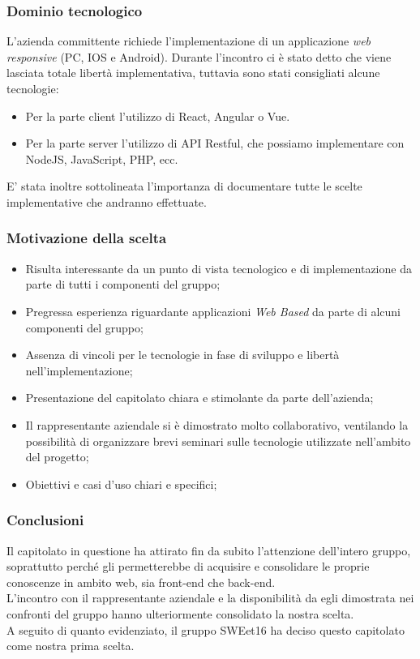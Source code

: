 \documentclass[a4paper, 11pt]{article}
\begin{document}
\subsubsection{Dominio tecnologico}
L'azienda committente richiede l'implementazione di un applicazione \textit{web responsive} (PC, IOS e Android).
Durante l'incontro ci è stato detto che viene lasciata totale libertà implementativa, tuttavia sono stati consigliati alcune tecnologie:
\begin{itemize}
    \item Per la parte client l'utilizzo di React, Angular o Vue.
    \item Per la parte server l'utilizzo di API Restful, che possiamo implementare con NodeJS, JavaScript, PHP, ecc.
\end{itemize}
E' stata inoltre sottolineata l'importanza di documentare tutte le scelte implementative che andranno effettuate.

\pagebreak

\subsubsection{Motivazione della scelta}
\begin{itemize}
    \item Risulta interessante da un punto di vista tecnologico e di implementazione da parte di tutti i componenti del gruppo;
    \item Pregressa esperienza riguardante applicazioni \textit{Web Based} da parte di alcuni componenti del gruppo;
    \item Assenza di vincoli per le tecnologie in fase di sviluppo e libertà nell'implementazione;
    \item Presentazione del capitolato chiara e stimolante da parte dell'azienda;
    \item Il rappresentante aziendale si è dimostrato molto collaborativo, ventilando la possibilità di organizzare brevi seminari sulle tecnologie utilizzate nell'ambito del progetto;
    \item Obiettivi e casi d'uso chiari e specifici;
\end{itemize}

\subsubsection{Conclusioni}
Il capitolato in questione ha attirato fin da subito l'attenzione dell'intero gruppo, soprattutto perché gli permetterebbe  di acquisire e consolidare le proprie conoscenze in ambito web, sia front-end che back-end. \\
L'incontro con il rappresentante aziendale e la disponibilità da egli dimostrata nei confronti del gruppo hanno ulteriormente consolidato la nostra scelta. \\ 
A seguito di quanto evidenziato, il gruppo SWEet16 ha deciso questo capitolato come nostra prima scelta.
\end{document}
